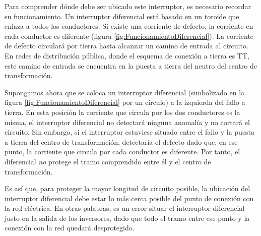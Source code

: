 Para comprender dónde debe ser ubicado este interruptor, es necesario
recordar su funcionamiento. Un interruptor diferencial está basado en
un toroide que enlaza a todos los conductores. Si existe una corriente
de defecto, la corriente en cada conductor es diferente (figura
\ref{fig:FuncionamientoDiferencial}).  La corriente de defecto
circulará por tierra hasta alcanzar un camino de entrada al
circuito. En redes de distribución pública, donde el esquema de
conexión a tierra es TT, este camino de entrada se encuentra en la
puesta a tierra del neutro del centro de transformación. 

Supongamos ahora que se coloca un interruptor diferencial (simbolizado
en la figura \ref{fig:FuncionamientoDiferencial} por un círculo) a la
izquierda del fallo a tierra. En esta posición la corriente que
circula por los dos conductores es la misma, el interruptor
diferencial no detectará ninguna anomalía y no cortará el
circuito. Sin embargo, si el interruptor estuviese situado entre el
fallo y la puesta a tierra del centro de transformación, detectaría el
defecto dado que, en ese punto, la corriente que circula por cada
conductor es diferente. Por tanto, el diferencial \emph{no} protege el
tramo comprendido entre él y el centro de transformación. 

Es así que, para proteger la mayor longitud de circuito posible, la
ubicación del interruptor diferencial debe estar lo más cerca posible
del punto de conexión con la red eléctrica. En otras palabras, es un
error situar el interruptor diferencial justo en la salida de los
inversores, dado que todo el tramo entre ese punto y la conexión con
la red quedará desprotegido.

